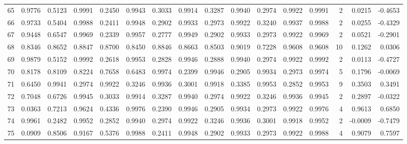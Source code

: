 \begin{tabular}{lrrrrrrrrrrrrrrr}
65  &      0.9776 &  0.5123 &  0.9991 &  0.2450 &  0.9943 &  0.3033 &  0.9914 &  0.3287 &  0.9940 &  0.2974 &   0.9922 &     0.9991 &      2 &                    0.0215 &                    -0.4653 \\
66  &      0.9733 &  0.5404 &  0.9988 &  0.2411 &  0.9948 &  0.2902 &  0.9933 &  0.2973 &  0.9922 &  0.3240 &   0.9937 &     0.9988 &      2 &                    0.0255 &                    -0.4329 \\
67  &      0.9448 &  0.6547 &  0.9969 &  0.2339 &  0.9957 &  0.2777 &  0.9949 &  0.2902 &  0.9933 &  0.2973 &   0.9922 &     0.9969 &      2 &                    0.0521 &                    -0.2901 \\
68  &      0.8346 &  0.8652 &  0.8847 &  0.8700 &  0.8450 &  0.8846 &  0.8663 &  0.8503 &  0.9019 &  0.7228 &   0.9608 &     0.9608 &     10 &                    0.1262 &                     0.0306 \\
69  &      0.9879 &  0.5152 &  0.9992 &  0.2618 &  0.9953 &  0.2828 &  0.9946 &  0.2888 &  0.9940 &  0.2974 &   0.9922 &     0.9992 &      2 &                    0.0113 &                    -0.4727 \\
70  &      0.8178 &  0.8109 &  0.8224 &  0.7658 &  0.6483 &  0.9974 &  0.2399 &  0.9946 &  0.2905 &  0.9934 &   0.2973 &     0.9974 &      5 &                    0.1796 &                    -0.0069 \\
71  &      0.6450 &  0.9941 &  0.2974 &  0.9922 &  0.3246 &  0.9936 &  0.3001 &  0.9918 &  0.3385 &  0.9953 &   0.2852 &     0.9953 &      9 &                    0.3503 &                     0.3491 \\
72  &      0.7048 &  0.6726 &  0.9945 &  0.3033 &  0.9914 &  0.3287 &  0.9940 &  0.2974 &  0.9922 &  0.3246 &   0.9936 &     0.9945 &      2 &                    0.2897 &                    -0.0322 \\
73  &      0.0363 &  0.7213 &  0.9624 &  0.4336 &  0.9976 &  0.2390 &  0.9946 &  0.2905 &  0.9934 &  0.2973 &   0.9922 &     0.9976 &      4 &                    0.9613 &                     0.6850 \\
74  &      0.9961 &  0.2482 &  0.9952 &  0.2852 &  0.9940 &  0.2974 &  0.9922 &  0.3246 &  0.9936 &  0.3001 &   0.9918 &     0.9952 &      2 &                   -0.0009 &                    -0.7479 \\
75  &      0.0909 &  0.8506 &  0.9167 &  0.5376 &  0.9988 &  0.2411 &  0.9948 &  0.2902 &  0.9933 &  0.2973 &   0.9922 &     0.9988 &      4 &                    0.9079 &                     0.7597 \\

\end{tabular}
